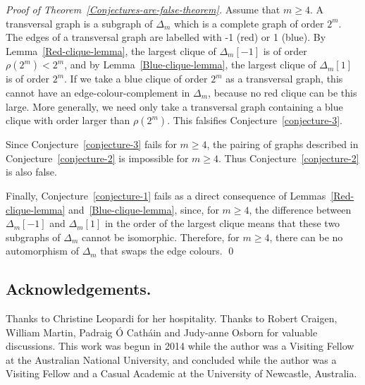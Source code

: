 \documentclass[12pt,a4paper]{article}
\newenvironment{proofof}[1]{\noindent\emph{Proof of #1.}}{\qed}
\begin{document}
\begin{proofof}{Theorem~\ref{Conjectures-are-false-theorem}}
Assume that $m \geqslant 4$.
A transversal graph is a subgraph of $\varDelta_m$ which is a complete graph of order $2^m$.
The edges of a transversal graph are labelled with -1 (red) or 1 (blue).
By Lemma~\ref{Red-clique-lemma}, the largest clique of $\varDelta_m[-1]$ is of order $\rho(2^m) < 2^m$,
and by Lemma~\ref{Blue-clique-lemma}, the largest clique of $\varDelta_m[1]$ is of order $2^m$.
If we take a blue clique of order $2^m$ as a transversal graph, this cannot have an edge-colour-complement
in $\varDelta_m$, because no red clique can be this large.
More generally, we need only take a transversal graph containing a blue clique with order larger than $\rho(2^m)$.
This falsifies Conjecture~\ref{conjecture-3}.

Since Conjecture~\ref{conjecture-3} fails for $m \geqslant 4$, 
the pairing of graphs described in Conjecture~\ref{conjecture-2} is impossible for $m \geqslant 4$.
Thus Conjecture~\ref{conjecture-2} is also false.

Finally, Conjecture~\ref{conjecture-1} fails as a direct consequence of Lemmas~\ref{Red-clique-lemma} and~\ref{Blue-clique-lemma},
since, for $m \geqslant 4$, the difference between $\varDelta_m[-1]$  and $\varDelta_m[1]$ in the order of the largest clique
means that these two subgraphs of $\varDelta_m$ cannot be isomorphic.
Therefore, for $m \geqslant 4$,  there can be no automorphism of $\varDelta_m$ that swaps the edge colours. 
\end{proofof}


\subsection*{Acknowledgements.}

Thanks to Christine Leopardi for her hospitality.
Thanks to Robert Craigen, William Martin,
Padraig {\'O} Cath{\'a}in and Judy-anne Osborn for valuable discussions.
This work was begun in 2014 while the author was a Visiting Fellow at the Australian National
University, and concluded while the author was a Visiting Fellow and a Casual Academic at the University of Newcastle, Australia.


\end{document}
